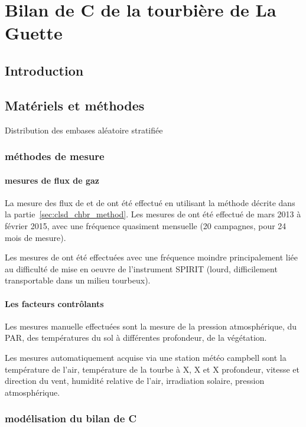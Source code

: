 \chapter{Bilan de C de la tourbière de La Guette}
\newpage

\section{Introduction}

\section{Matériels et méthodes}

Distribution des embases aléatoire stratifiée
\subsection{méthodes de mesure}

\subsubsection{mesures de flux de gaz}
La mesure des flux de \coo et de \chh ont été effectué en utilisant la méthode décrite dans la partie~\ref{sec:clsd_chbr_method}.
Les mesures de \coo ont été effectué de mars 2013 à février 2015, avec une fréquence quasiment mensuelle (20 campagnes, pour 24 mois de mesure).

Les mesures de \chh ont été effectuées avec une fréquence moindre principalement liée au difficulté de mise en oeuvre de l'instrument SPIRIT (lourd, difficilement transportable dans un milieu tourbeux).

\subsubsection{Les facteurs contrôlants}

Les mesures manuelle effectuées sont la mesure de la pression atmosphérique, du PAR, des températures du sol à différentes profondeur, de la végétation.

Les mesures automatiquement acquise via une station météo campbell sont la température de l'air, température de la tourbe à X, X et X profondeur, vitesse et direction du vent, humidité relative de l'air, irradiation solaire, pression atmosphérique.

\subsection{modélisation du bilan de C}

